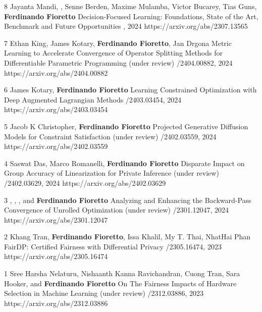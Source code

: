 \begin{pubs}

\wsentry
	{8}
	{Jayanta Mandi, , Senne Berden, Maxime Mulamba, Victor Bucarey, Tias Guns, {\bf Ferdinando Fioretto}} 
	{Decision-Focused Learning: Foundations, State of the Art, Benchmark and Future Opportunities}
	{, 2024}
	{https://arxiv.org/abs/2307.13565}

\wsentry
	{7}
	{Ethan King, \student{} James Kotary, {\bf Ferdinando Fioretto}, Jan Drgona}
	{Metric Learning to Accelerate Convergence of Operator Splitting Methods for Differentiable Parametric Programming}
	{(under review) /2404.00882, 2024}
	{https://arxiv.org/abs/2404.00882}

\wsentry
	{6}
	{\student{} James Kotary, {\bf Ferdinando Fioretto}}
	{Learning Constrained Optimization with Deep Augmented Lagrangian Methods}
	{/2403.03454, 2024}
	{https://arxiv.org/abs/2403.03454}

\wsentry
	{5}
	{\student{} Jacob K Christopher, {\bf Ferdinando Fioretto}}
  	{Projected Generative Diffusion Models for Constraint Satisfaction}
	{(under review) /2402.03559, 2024}
	{https://arxiv.org/abs/2402.03559}

\wsentry
	{4}
	{\student{} Saswat Das, Marco Romanelli, {\bf Ferdinando Fioretto}}
	{Disparate Impact on Group Accuracy of Linearization for Private Inference}
	{(under review) /2402.03629, 2024}
	{https://arxiv.org/abs/2402.03629}

\wsentry
	{3}
	{, , ,
	and {\bf Ferdinando Fioretto}}
	{Analyzing and Enhancing the Backward-Pass Convergence of Unrolled Optimization}	
	{(under review) /2301.12047, 2024}
	{https://arxiv.org/abs/2301.12047}

\wsentry
	{2}
	{Khang Tran, {\bf Ferdinando Fioretto}, Issa Khalil, My T. Thai, NhatHai Phan} 
	{FairDP: Certified Fairness with Differential Privacy}
	{/2305.16474, 2023}
	{https://arxiv.org/abs/2305.16474}

\wsentry
	{1}
	{\student{} Sree Harsha Nelaturu, \student{} Nishaanth Kanna Ravichandran, \student{} Cuong Tran, Sara Hooker, and {\bf Ferdinando Fioretto}}
	{On The Fairness Impacts of Hardware Selection in Machine Learning}	
	{(under review) /2312.03886, 2023}
	{https://arxiv.org/abs/2312.03886}
\end{pubs}

